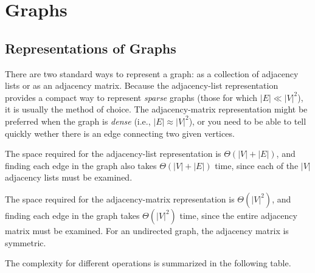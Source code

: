 




\section{Graphs}\label{sec:graphs}
\subsection{Representations of Graphs}
There are two standard ways to represent a graph: as a collection of adjacency lists or as an adjacency matrix.
Because the adjacency-list representation provides a compact way to represent \emph{sparse} graphs (those for which \(|E| \ll |V|^2\)), it is usually the method of choice.
The adjacency-matrix representation might be preferred when the graph is \emph{dense} (i.e., \(|E| \approx |V|^2\)), or you need to be able to tell quickly wether there is an edge connecting two given vertices.

The space required for the adjacency-list representation is \(\Theta(|V| + |E|)\), and finding each edge in the graph also takes \(\Theta(|V| + |E|)\) time, since each of the \(|V|\) adjacency lists must be examined.

The space required for the adjacency-matrix representation is \(\Theta(|V|^2)\), and finding each edge in the graph takes \(\Theta(|V|^2)\) time, since the entire adjacency matrix must be examined.
For an undirected graph, the adjacency matrix is symmetric.%

The complexity for different operations is summarized in the following table.





